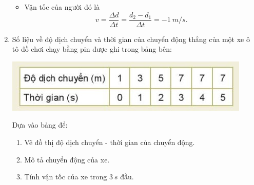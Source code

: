 \begin{enumerate}[label=\bfseries Bài \arabic*:]
{\begin{enumerate}[label=\alph*)]
\begin{itemize}
				$$\dfrac{|25 - 15|}{20} = \SI{1}{m}.$$
				\item Vận tốc của người đó là
					$$v = \dfrac{\Delta d}{\Delta t} = \dfrac{d_2 - d_1}{\Delta t} = -\SI{1}{m/s}.$$
			\end{itemize}
		\end{enumerate}		
	}
	
	\item {}
	
	{
		Số liệu về độ dịch chuyển và thời gian của chuyển động thẳng của một xe ô tô đồ chơi chạy bằng pin được ghi trong bảng bên: 
		\begin{center}
			\includegraphics[scale=1]{../figs/VN10-2022-PH-TP006-3.jpg}
		\end{center}
		
		Dựa vào bảng để:
		
		\begin{enumerate}[label=\alph*)]
			\item Vẽ đồ thị độ dịch chuyển - thời gian của chuyển động.
			\item Mô tả chuyển động của xe.
			\item Tính vận tốc của xe trong $\SI{3}{s}$ đầu.
		\end{enumerate}
	}
\end{enumerate}
